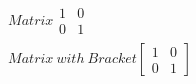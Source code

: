 \documentclass{article}
\begin{document}
\begin{align*}
Matrix 
\begin{matrix}
1 & 0 \\
0 & 1
\end{matrix}
 \\ Matrix \ with \ Bracket 
\left[
\begin{matrix}
1 & 0 \\
0 & 1
\end{matrix}
\right]
\end{align*}
\end{document}
